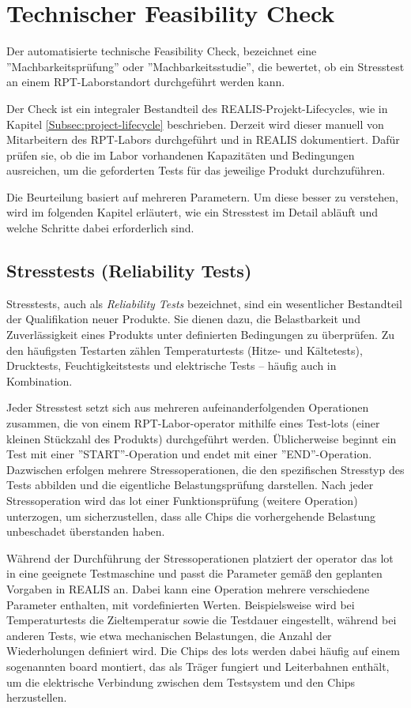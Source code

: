 \section{Technischer Feasibility Check}
Der automatisierte technische Feasibility Check, bezeichnet eine ''Machbarkeitsprüfung'' oder ''Machbarkeitsstudie'', die bewertet, ob ein Stresstest an einem \gls{RPT}-Laborstandort durchgeführt werden kann.

Der Check ist ein integraler Bestandteil des \gls{REALIS}-Projekt-Lifecycles, wie in Kapitel \ref{Subsec:project-lifecycle} beschrieben. Derzeit wird dieser manuell von Mitarbeitern des \gls{RPT}-Labors durchgeführt und in \gls{REALIS} dokumentiert. Dafür prüfen sie, ob die im Labor vorhandenen Kapazitäten und Bedingungen ausreichen, um die geforderten Tests für das jeweilige Produkt durchzuführen.

Die Beurteilung basiert auf mehreren Parametern. Um diese besser zu verstehen, wird im folgenden Kapitel erläutert, wie ein Stresstest im Detail abläuft und welche Schritte dabei erforderlich sind.


\subsection{Stresstests (Reliability Tests)}

Stresstests, auch als \textit{Reliability Tests} bezeichnet, sind ein wesentlicher Bestandteil der Qualifikation neuer Produkte. Sie dienen dazu, die Belastbarkeit und Zuverlässigkeit eines Produkts unter definierten Bedingungen zu überprüfen. Zu den häufigsten Testarten zählen Temperaturtests (Hitze- und Kältetests), Drucktests, Feuchtigkeitstests und elektrische Tests – häufig auch in Kombination.

Jeder Stresstest setzt sich aus mehreren aufeinanderfolgenden Operationen zusammen, die von einem \gls{RPT}-Labor-\gls{operator} mithilfe eines Test-\glspl{lot} (einer kleinen Stückzahl des Produkts) durchgeführt werden. Üblicherweise beginnt ein Test mit einer ''START''-Operation und endet mit einer ''END''-Operation. Dazwischen erfolgen mehrere Stressoperationen, die den spezifischen Stresstyp des Tests abbilden und die eigentliche Belastungsprüfung darstellen. Nach jeder Stressoperation wird das \gls{lot} einer Funktionsprüfung (weitere Operation) unterzogen, um sicherzustellen, dass alle Chips die vorhergehende Belastung unbeschadet überstanden haben.

Während der Durchführung der Stressoperationen platziert der \gls{operator} das \gls{lot} in eine geeignete Testmaschine und passt die Parameter gemäß den geplanten Vorgaben in \gls{REALIS} an. Dabei kann eine Operation mehrere verschiedene Parameter enthalten, mit vordefinierten Werten. Beispielsweise wird bei Temperaturtests die Zieltemperatur sowie die Testdauer eingestellt, während bei anderen Tests, wie etwa mechanischen Belastungen, die Anzahl der Wiederholungen definiert wird. Die Chips des \glspl{lot} werden dabei häufig auf einem sogenannten \gls{board} montiert, das als Träger fungiert und Leiterbahnen enthält, um die elektrische Verbindung zwischen dem Testsystem und den Chips herzustellen.

